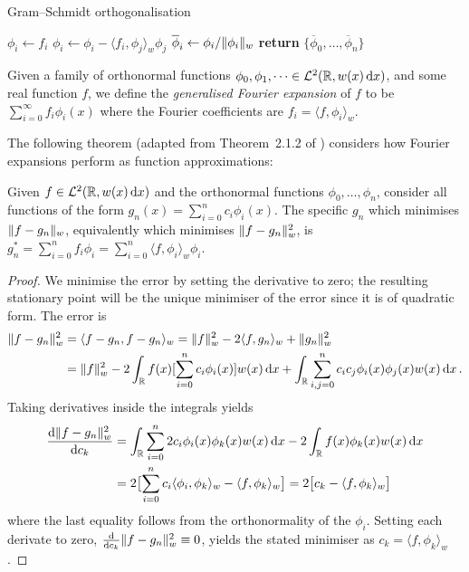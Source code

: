 \begin{algorithm}
\caption{Gram--Schmidt orthogonalisation}
\label{alg:gs}
\begin{algorithmic}[1]
\State $\phi_i \gets f_i$
\State $\phi_i \gets \phi_i - \langle f_i, \phi_j \rangle_w \phi_j$
\EndFor
\State $\overline{\phi}_i \gets \phi_i / \lVert \phi_i\rVert_w$
\EndFor
\State \textbf{return} $\{ \overline{\phi}_0, \dots, \overline{\phi}_n \}$
\EndFunction
\end{algorithmic}
\end{algorithm}



\begin{definition}
Given a family of orthonormal functions $\phi_0, \phi_1,\dots \in \mathcal{L}^2(\mathbb{R}, w(x) \mathop{}\!\mathrm{d} x)$, and some real function $f$, we define the \emph{generalised Fourier expansion} of $f$ to be $\sum_{i=0}^\infty f_i \phi_i(x)$ where the Fourier coefficients are $f_i = \langle f, \phi_i \rangle_w$.
\end{definition}

The following theorem (adapted from Theorem~2.1.2 of \cite{Szegoe1939}) considers how Fourier expansions perform as function approximations:

\begin{theorem}
Given $f \in \mathcal{L}^2(\mathbb{R}, w(x) \mathop{}\!\mathrm{d} x)$ and the orthonormal functions $\phi_0,\dots,\phi_n$, consider all functions of the form $g_n(x) = \sum_{i=0}^n c_i \phi_i(x)$. The specific $g_n$ which minimises $\lVert f - g_n\rVert_w$, equivalently which minimises $\lVert f - g_n\rVert_w^2$, is $g_n^* = \sum_{i=0}^n f_i \phi_i = \sum_{i=0}^n \langle f, \phi_i \rangle_w \phi_i$.
\end{theorem}
\begin{proof}
We minimise the error by setting the derivative to zero; the resulting stationary point will be the unique minimiser of the error since it is of quadratic form. The error is
\begin{align*}
\lVert f - g_n\rVert_w^2 &= \langle f-g_n, f-g_n \rangle_w = \lVert f\rVert_w^2 -2 \langle f, g_n \rangle_w + \lVert g_n\rVert_w^2 \\
&= \lVert f\rVert_w^2 - 2 \int_{\mathbb{R}} f(x) [\sum_{i=0}^n c_i \phi_i(x) ] w(x) \mathop{}\!\mathrm{d} x + \int_{\mathbb{R}} \sum_{i,j=0}^n c_i c_j \phi_i(x) \phi_j(x) w(x) \mathop{}\!\mathrm{d} x \,.
\end{align*}
Taking derivatives inside the integrals yields
\begin{align*}
\frac{\mathop{}\!\mathrm{d} \lVert f - g_n\rVert_w^2}{\mathop{}\!\mathrm{d} c_k}
&= \int_{\mathbb{R}} \sum_{i=0}^n 2 c_i \phi_i(x) \phi_k(x) w(x) \mathop{}\!\mathrm{d} x - 2 \int_{\mathbb{R}} f(x) \phi_k(x)  w(x) \mathop{}\!\mathrm{d} x \\
&= 2 \bigl[ \sum_{i=0}^n  c_i \langle \phi_i, \phi_k \rangle_w - \langle f, \phi_k \rangle_w \bigr] = 2 \bigl[ c_k - \langle f, \phi_k \rangle_w \bigr]
\end{align*}
where the last equality follows from the orthonormality of the $\phi_i$. Setting each derivate to zero, $\frac{\mathop{}\!\mathrm{d}}{\mathop{}\!\mathrm{d} c_k} \lVert f - g_n\rVert_w^2 \equiv 0$, yields the stated minimiser as $c_k = \langle f, \phi_k \rangle_w$.
\end{proof}

